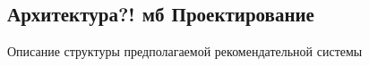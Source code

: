 \subsection{Архитектура?! мб Проектирование}
    Описание структуры предполагаемой рекомендательной системы

